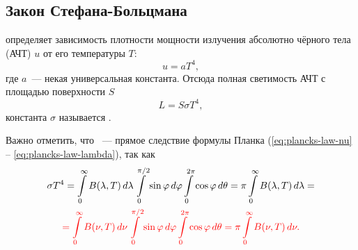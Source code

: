 \subsection{Закон Стефана-Больцмана}
 определяет зависимость плотности мощности излучения абсолютно чёрного тела (АЧТ) $u$ от его температуры $T$:
\begin{equation}
	u = a T^4,
\end{equation}
где $a$~--- некая универсальная константа.
Отсюда полная светимость АЧТ с площадью поверхности $S$
\begin{equation}
	L = S \sigma T^4,
	\label{eq:steff-bol-law}
\end{equation}
константа $\sigma$ называется .

Важно отметить, что ~--- прямое следствие формулы Планка (\ref{eq:plancks-law-nu} -- \ref{eq:plancks-law-lambda}), так как
\begin{multline}
	\sigma T^4 = \int\limits^\infty_0 B(\lambda, T)\,d\lambda \int\limits_0^{\pi/2} \sin \varphi\, d\varphi \int\limits_0^{2\pi} \cos \varphi\, d\theta = \pi \int\limits^\infty_0 B(\lambda, T)\,d\lambda =\\
	\textcolor{red}{= \int\limits^\infty_0 B(\nu, T)\,d\nu \int\limits_0^{\pi/2} \sin \varphi\, d\varphi \int\limits_0^{2\pi} \cos \varphi\, d\theta = \pi \int\limits^\infty_0 B(\nu, T)\,d\nu.}
\end{multline}

